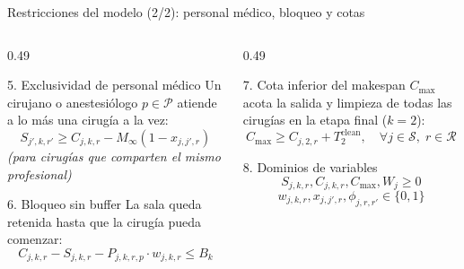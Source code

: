 \documentclass[aspectratio=169,11pt]{beamer}
\begin{document}
\begin{frame}{Restricciones del modelo (2/2): personal médico, bloqueo y cotas}
  \begin{columns}[t]
    \begin{column}{0.49\textwidth}
      \begin{block}{5. Exclusividad de personal médico}
        Un cirujano o anestesiólogo $p \in \mathcal{P}$ atiende a lo más una cirugía a la vez:
        \small
        \begin{equation*}
          S_{j',k,r'} \ge C_{j,k,r} - M_{\infty}(1 - x_{j,j',r})
        \end{equation*}
        \textit{(para cirugías que comparten el mismo profesional)}
      \end{block}

      \begin{alertblock}{6. Bloqueo sin buffer}
        La sala queda retenida hasta que la cirugía pueda comenzar:
        \small
        \begin{equation*}
          C_{j,k,r} - S_{j,k,r} - P_{j,k,r,p} \cdot w_{j,k,r} \le B_k
        \end{equation*}
      \end{alertblock}
    \end{column}

    \begin{column}{0.49\textwidth}
      \begin{block}{7. Cota inferior del makespan}
        $C_{\max}$ acota la salida y limpieza de todas las cirugías en la etapa final ($k=2$):
        \small
        \begin{equation*}
          C_{\max} \ge C_{j,2,r} + T^{\text{clean}}_2, \quad \forall j \in \mathcal{S},\; r \in \mathcal{R}
        \end{equation*}
      \end{block}

      \begin{block}{8. Dominios de variables}
        \small
        \begin{equation*}
          S_{j,k,r}, C_{j,k,r}, C_{\max}, W_j \ge 0
        \end{equation*}
        \begin{equation*}
          w_{j,k,r}, x_{j,j',r}, \phi_{j,r,r'} \in \{0, 1\}
        \end{equation*}
      \end{block}
    \end{column}
  \end{columns}
\end{frame}
\end{document}
